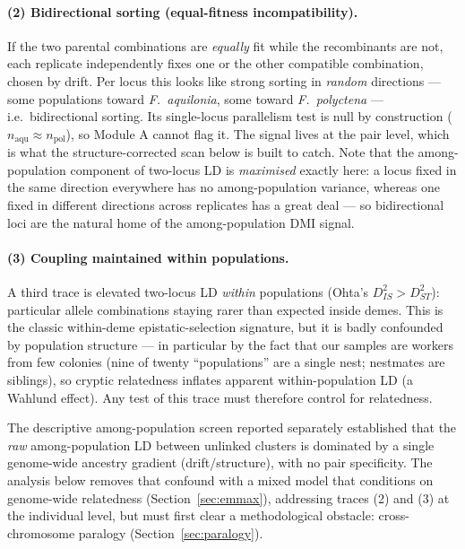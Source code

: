 \documentclass[11pt]{article}
\newcommand{\Faq}{\textit{F.~aquilonia}}
\newcommand{\Fpo}{\textit{F.~polyctena}}
\begin{document}
\paragraph{(2) Bidirectional sorting (equal-fitness incompatibility).} If the two
parental combinations are \emph{equally} fit while the recombinants are not, each
replicate independently fixes one or the other compatible combination, chosen by
drift. Per locus this looks like strong sorting in \emph{random} directions --- some
populations toward \Faq, some toward \Fpo{} --- i.e.\ bidirectional sorting. Its
single-locus parallelism test is null by construction ($n_{\mathrm{aqu}}\approx
n_{\mathrm{pol}}$), so Module A cannot flag it. The signal lives at the pair level,
which is what the structure-corrected scan below is built to catch. Note that the among-population component of two-locus LD
is \emph{maximised} exactly here: a locus fixed in the same direction everywhere has
no among-population variance, whereas one fixed in different directions across
replicates has a great deal --- so bidirectional loci are the natural home of the
among-population DMI signal.

\paragraph{(3) Coupling maintained within populations.} A third trace is elevated
two-locus LD \emph{within} populations (Ohta's $D^2_{IS}>D^2_{ST}$): particular
allele combinations staying rarer than expected inside demes. This is the classic
within-deme epistatic-selection signature, but it is badly confounded by population
structure --- in particular by the fact that our samples are workers from few
colonies (nine of twenty ``populations'' are a single nest; nestmates are siblings),
so cryptic relatedness inflates apparent within-population LD (a Wahlund effect). Any
test of this trace must therefore control for relatedness.

\medskip
\noindent The descriptive among-population screen reported separately established
that the \emph{raw} among-population LD between unlinked clusters is dominated by a
single genome-wide ancestry gradient (drift/structure), with no pair specificity.
The analysis below removes that confound with a mixed model that conditions on
genome-wide relatedness (Section~\ref{sec:emmax}), addressing traces (2) and (3) at the
individual level, but must first clear a methodological obstacle: cross-chromosome
paralogy (Section~\ref{sec:paralogy}).
\end{document}
